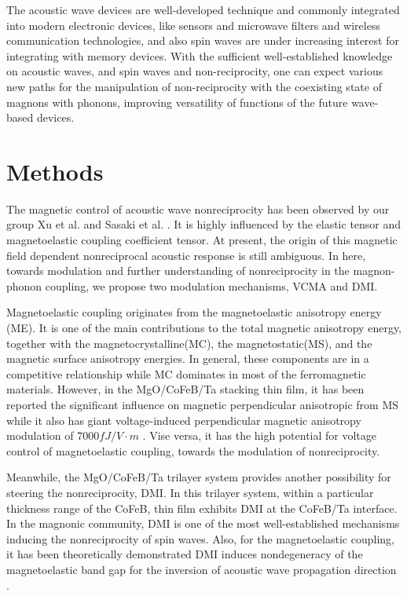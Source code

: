 The acoustic wave devices are well-developed technique and commonly integrated into modern electronic devices, like sensors and microwave filters and wireless communication technologies, and also spin waves are under increasing interest for integrating with memory devices. With the sufficient well-established knowledge on acoustic waves, and spin waves and non-reciprocity, one can expect various new paths for the manipulation of non-reciprocity with the coexisting state of magnons with phonons, improving versatility of functions of the future wave-based devices.




\section*{Methods}

The magnetic control of acoustic wave nonreciprocity has been observed by our group Xu et al. and Sasaki et al.  \cite{SasakiNRMS2017,XuIEEMS2018}. It is highly influenced by the elastic tensor and magnetoelastic coupling coefficient tensor. At present, the origin of this magnetic field dependent nonreciprocal acoustic response is still ambiguous. In here, towards modulation and further understanding of nonreciprocity in the magnon-phonon coupling, we propose two modulation mechanisms, VCMA and DMI.             

Magnetoelastic coupling originates from the magnetoelastic anisotropy energy (ME). It is one of the main contributions to the total magnetic anisotropy energy, together with the magnetocrystalline(MC), the magnetostatic(MS), and the magnetic surface anisotropy energies. In general, these components are in a competitive relationship while MC dominates in most of the ferromagnetic materials. However, in the MgO/CoFeB/Ta stacking thin film, it has been reported the significant influence on magnetic perpendicular anisotropic from MS  \cite{GowthamPMA2016} while it also has giant voltage-induced perpendicular magnetic anisotropy modulation of $7000 fJ/V\cdot m$ \cite{YuPMA2015}. Vise versa, it has the high potential for voltage control of magnetoelastic coupling, towards the modulation of nonreciprocity.

Meanwhile, the MgO/CoFeB/Ta trilayer system provides another possibility for steering the nonreciprocity, DMI. In this trilayer system, within a particular thickness range of the CoFeB, thin film exhibits DMI at the CoFeB/Ta interface. In the magnonic community, DMI is one of the most well-established mechanisms inducing the nonreciprocity of spin waves. Also, for the magnetoelastic coupling, it has been theoretically demonstrated DMI induces nondegeneracy of the magnetoelastic band gap for the inversion of acoustic wave propagation direction \cite{VerbaNRMSDMI2018}.

